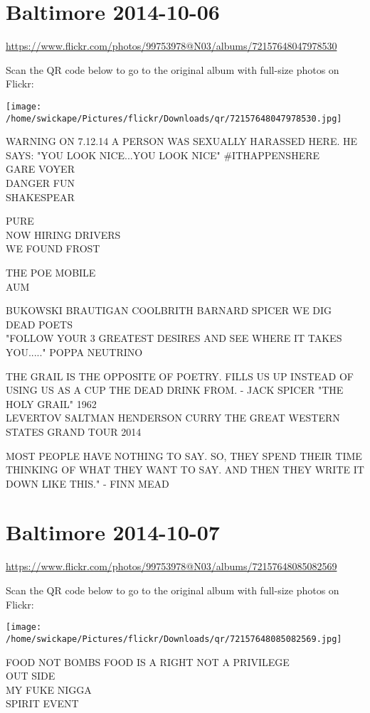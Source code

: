 \documentclass[10pt,letterpaper]{article}
\begin{document}
\section*{Baltimore 2014-10-06}

\url{https://www.flickr.com/photos/99753978@N03/albums/72157648047978530}

Scan the QR code below to go to the original album with full-size photos on Flickr:

\texttt{[image: /home/swickape/Pictures/flickr/Downloads/qr/72157648047978530.jpg]}


WARNING ON 7.12.14 A PERSON WAS SEXUALLY HARASSED HERE.  HE SAYS: "YOU LOOK NICE...YOU LOOK NICE" \#ITHAPPENSHERE\\
GARE VOYER\\
DANGER FUN\\
SHAKESPEAR

PURE\\
NOW HIRING DRIVERS\\
WE FOUND FROST

THE POE MOBILE\\
AUM

BUKOWSKI BRAUTIGAN COOLBRITH BARNARD SPICER WE DIG DEAD POETS\\
"FOLLOW YOUR 3 GREATEST DESIRES AND SEE WHERE IT TAKES YOU....." POPPA NEUTRINO

THE GRAIL IS THE OPPOSITE OF POETRY.  FILLS US UP INSTEAD OF USING US AS A CUP THE DEAD DRINK FROM.  {-} JACK SPICER "THE HOLY GRAIL" 1962\\
LEVERTOV SALTMAN HENDERSON CURRY THE GREAT WESTERN STATES GRAND TOUR 2014

MOST PEOPLE HAVE NOTHING TO SAY.  SO, THEY SPEND THEIR TIME THINKING OF WHAT THEY WANT TO SAY.  AND THEN THEY WRITE IT DOWN LIKE THIS." {-} FINN MEAD


\section*{Baltimore 2014-10-07}

\url{https://www.flickr.com/photos/99753978@N03/albums/72157648085082569}

Scan the QR code below to go to the original album with full-size photos on Flickr:

\texttt{[image: /home/swickape/Pictures/flickr/Downloads/qr/72157648085082569.jpg]}


FOOD NOT BOMBS FOOD IS A RIGHT NOT A PRIVILEGE\\
OUT SIDE\\
MY FUKE NIGGA\\
SPIRIT EVENT
\end{document}
